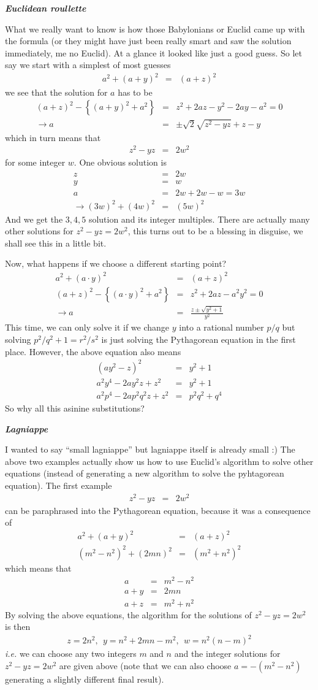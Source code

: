 \documentclass[aps,preprint,preprintnumbers,nofootinbib,showpacs,prd]{revtex4-1}
\newcommand{\ie}{{\it i.e.} }
\newcommand{\nbea}{\begin{eqnarray*}}
\newcommand{\neea}{\end{eqnarray*}}
\begin{document}
\bigskip\textbf{\textit {Euclidean roullette}}

What we really want to know is how those Babylonians or Euclid came up with the formula (or they might have just been really smart and saw the solution immediately, me no Euclid). At a glance it looked like just a good guess. So let say we start with a simplest of most guesses
%
\nbea
a^2 + (a+y)^2  & = & (a + z)^2
\neea
%
we see that the solution for $a$ has to be
%
\nbea
(a + z)^2 - \left \{ (a+y)^2 + a^2 \right \} & = & z^2 + 2 a z - y^2 - 2 a y - a^2 = 0 \\
\rightarrow a & = & \pm \sqrt{2}\sqrt{z^2 - yz} + z - y
\neea
%
which in turn means that
%
\nbea
z^2 - yz & = & 2 w^2
\neea
%
for some integer $w$. One obvious solution is
%
\nbea
z & = & 2w \\
y & = & w \\
a & = & 2w + 2w - w = 3w \\
\rightarrow (3w)^2 + (4w)^2 & = & (5w)^2
\neea
%
And we get the $3,4,5$ solution and its integer multiples. There are actually many other solutions for $z^2 - yz = 2 w^2$, this turns out to be a blessing in disguise, we shall see this in a little bit.

Now, what happens if we choose a different starting point?
%
\nbea
a^2 + (a \cdot y)^2  & = & (a + z)^2 \\
(a + z)^2 - \left \{ (a \cdot y)^2 + a^2 \right \} & = & z^2 + 2 a z - a^2 y^2 = 0 \\
\rightarrow a & = &\frac{z \pm \sqrt{y^2 + 1}}{y^2}
\neea
%
This time, we can only solve it if we change $y$ into a rational number $p/q$ but solving $p^2/q^2 + 1 = r^2/s^2$ is just solving the Pythagorean equation in the first place. However, the above equation also means
%
\nbea
(a y^2 - z)^2 & = & y^2 + 1 \\
a^2 y^4 - 2 a y^2 z + z^2 & = & y^2 + 1 \\
a^2 p^4 - 2 a p^2 q^2 z + z^2 & = & p^2 q^2 + q^4
\neea
%
So why all this asinine substitutions?

\bigskip\textit{\textbf{Lagniappe}}

I wanted to say ``small lagniappe'' but lagniappe itself is already small :) The above two examples actually show us how to use Euclid's algorithm to solve other equations (instead of generating a new algorithm to solve the pyhtagorean equation). The first example
%
\nbea
z^2 - yz & = & 2 w^2
\neea
% 
can be paraphrased into the Pythagorean equation, because it was a consequence of
%
\nbea
a^2 + (a+y)^2 & = & (a+z)^2 \\
(m^2-n^2)^2 + (2mn)^2 & = & (m^2+n^2)^2
\neea
%
which means that
%
\nbea
a & = & m^2-n^2 \\
a + y & = & 2mn \\
a + z & = & m^2 + n^2
\neea
%
By solving the above equations, the algorithm for the solutions of $z^2 - yz = 2 w^2$ is then
%
\nbea
z = 2 n^2,~~ y = n^2 + 2mn -m^2, ~~w = n^2 (n - m)^2
\neea
%
\ie we can choose any two integers $m$ and $n$ and the integer solutions for $z^2 - yz = 2 w^2$ are given above (note that we can also choose $a = -(m^2 - n^2)$ generating a slightly different final result).
\end{document}
